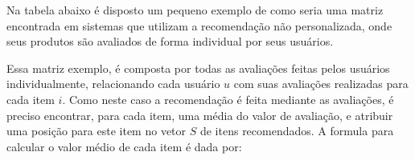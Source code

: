\documentclass[12pt,
				openright,
				twoside,
				a4paper,
				apter=TITLE,
				section=TITLE,
				subsection=TITLE,
				chapter=TITLE,
				english,
				brazil]{abntex2}
\newcommand{\mc}[3]{\multicolumn{#1}{#2}{#3}}
\begin{document}
Na tabela abaixo é disposto um pequeno exemplo de como seria uma matriz encontrada em sistemas que utilizam a recomendação não personalizada, onde seus produtos são avaliados de forma individual por seus usuários.



Essa matriz exemplo, é composta por todas as avaliações feitas pelos usuários individualmente, relacionando cada usuário $u$ com suas avaliações realizadas para cada item $i$. Como neste caso a recomendação é feita mediante as avaliações, é preciso encontrar, para cada item, uma média do valor de avaliação, e atribuir uma posição para este item no vetor $S$ de itens recomendados. A formula para calcular o valor médio de cada item é dada por:
\end{document}
